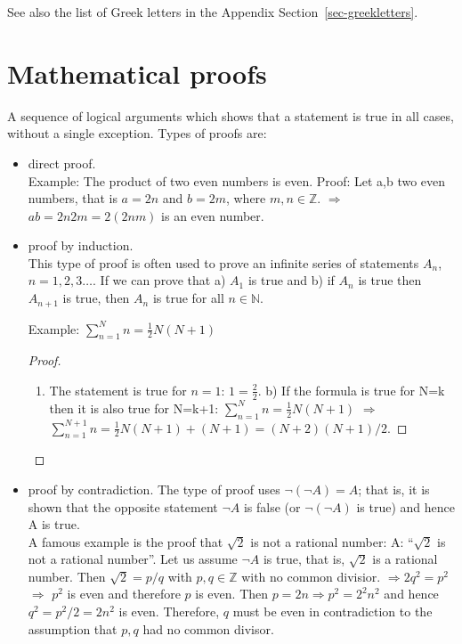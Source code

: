 \documentclass[
  a4paper,
  DIV=11,
  numbers=noendperiod,
  oneside]{scrreprt}
\providecommand{\tightlist}{%
  \setlength{\itemsep}{0pt}\setlength{\parskip}{0pt}}
\theoremstyle{definition}
\theoremstyle{remark}
\begin{document}
See also the list of Greek letters in the Appendix
Section~\ref{sec-greekletters}.

\section{Mathematical proofs}\label{mathematical-proofs}

A sequence of logical arguments which shows that a statement is true in
all cases, without a single exception. Types of proofs are:

\begin{itemize}
\item
  direct proof.\\
  Example: The product of two even numbers is even. Proof: Let a,b two
  even numbers, that is \(a=2 n\) and \(b= 2 m\), where
  \(m,n \in \mathbb{Z}\). \(\Rightarrow\) \(ab= 2n 2m = 2 (2nm)\) is an
  even number.
\item
  proof by induction.\\
  This type of proof is often used to prove an infinite series of
  statements \(A_n\), \(n=1,2,3 \ldots\). If we can prove that a)
  \(A_1\) is true and b) if \(A_n\) is true then \(A_{n+1}\) is true,
  then \(A_n\) is true for all \(n \in \mathbb{N}\).

  Example: \(\sum_{n=1}^N n = \frac{1}{2} N (N+1)\)

  \begin{proof}
  \leavevmode

  \begin{enumerate}
  \def\labelenumi{\alph{enumi})}
  \tightlist
  \item
    The statement is true for \(n=1\): \(1=\frac{2}{2}\). b) If the
    formula is true for N=k then it is also true for N=k+1:
    \(\sum_{n=1}^N n = \frac{1}{2} N (N+1)\) \(\Rightarrow\)
    \(\sum_{n=1}^{N+1} n = \frac{1}{2} N (N+1) + (N+1) = (N+2)(N+1)/2\).~◻
  \end{enumerate}

  \end{proof}
\item
  proof by contradiction. The type of proof uses \(\neg (\neg A) = A\);
  that is, it is shown that the opposite statement \(\neg A\) is false
  (or \(\neg (\neg A)\) is true) and hence A is true.\\
  A famous example is the proof that \(\sqrt{2}\) is not a rational
  number: A: ``\(\sqrt{2}\) is not a rational number''. Let us assume
  \(\neg A\) is true, that is, \(\sqrt{2}\) is a rational number. Then
  \(\sqrt{2} = p/q\) with \(p,q \in \mathbb{Z}\) with no common
  divisior. \(\Rightarrow  2q^2=p^2\) \(\Rightarrow\) \(p^2\) is even
  and therefore \(p\) is even. Then \(p=2n \Rightarrow p^2=2^2 n^2\) and
  hence \(q^2= p^2/2=2 n^2\) is even. Therefore, \(q\) must be even in
  contradiction to the assumption that \(p,q\) had no common divisor.
\end{itemize}
\end{document}
